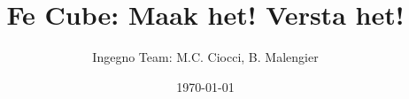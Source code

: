 \documentclass[11pt,a4paper]{article}
\newcommand{\nedt}[1]{{#1}}
\newcommand{\engt}[1]{ }
\begin{document}
 \title{\engt{Fe Cube: Make it! Understand it!} \nedt{Fe Cube: Maak het! Versta het!}}
 \author{Ingegno Team: M.C. Ciocci, B. Malengier}
 \date{\today}
 \maketitle

\begin{Parallel}{7.5cm}{7.5cm}


\newpage


\end{Parallel}
\end{document}
